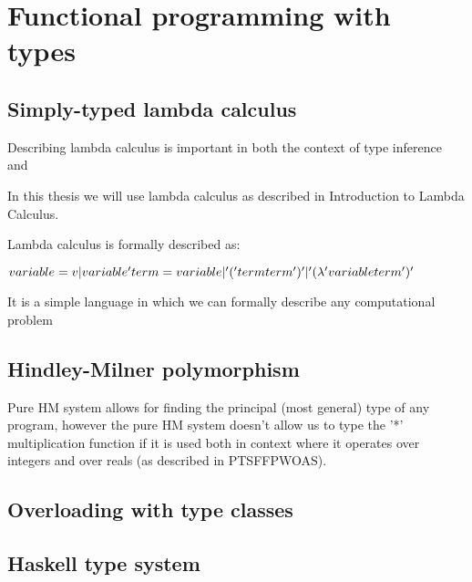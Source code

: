 \chapter{Functional programming with types}


\section{Simply-typed lambda calculus}

Describing lambda calculus is important in both the context of type inference and

In this thesis we will use lambda calculus as described in Introduction to Lambda Calculus.  %

Lambda calculus is formally described as:

$
    variable = v | variable' \\
    term = variable | '(' term term ')' |  '(\lambda' variable term ')'
$

It is a simple language in which we can formally describe any computational problem


\section{Hindley-Milner polymorphism}

Pure HM system allows for finding the principal (most general) type of any program, however
the pure HM system doesn't allow us to type the '*' multiplication function if it is used both
in context where it operates over integers and over reals (as described in PTSFFPWOAS). %


\section{Overloading with type classes}





\section{Haskell type system}

